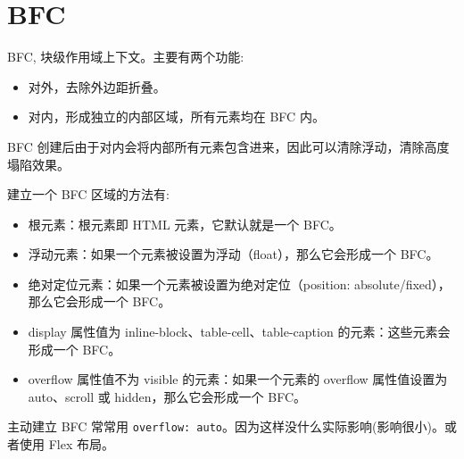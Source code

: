 \section{BFC}

BFC, 块级作用域上下文。主要有两个功能:
\begin{itemize}
  \item 对外，去除外边距折叠。
  \item 对内，形成独立的内部区域，所有元素均在 BFC 内。
\end{itemize}

BFC 创建后由于对内会将内部所有元素包含进来，因此可以清除浮动，清除高度塌陷效果。

建立一个 BFC 区域的方法有:
\begin{itemize}
  \item 根元素：根元素即 HTML 元素，它默认就是一个 BFC。
  \item 浮动元素：如果一个元素被设置为浮动（float），那么它会形成一个 BFC。
  \item 绝对定位元素：如果一个元素被设置为绝对定位（position: absolute/fixed），那么它会形成一个 BFC。
  \item display 属性值为 inline-block、table-cell、table-caption 的元素：这些元素会形成一个 BFC。
  \item overflow 属性值不为 visible 的元素：如果一个元素的 overflow 属性值设置为 auto、scroll 或 hidden，那么它会形成一个 BFC。
\end{itemize}

主动建立 BFC 常常用 \texttt{overflow: auto}。因为这样没什么实际影响(影响很小)。或者使用 Flex 布局。